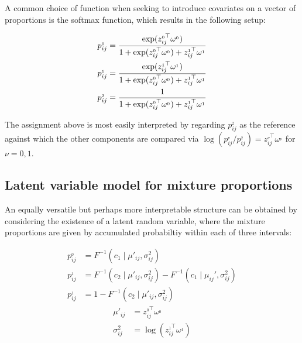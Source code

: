 A common choice of function when seeking to introduce covariates on a vector of proportions is the softmax function, which results in the following setup:

\begin{equation}
\begin{split}
p_{ij}^{_0} &= {\exp (z_{ij}^{_0\top} \omega^{_0}) \over 1 + \exp (z_{ij}^{_0\top} \omega^{_0})  + z_{ij}^{_1\top} \omega^{_1}} \\
p_{ij}^{_1} &= {\exp (z_{ij}^{_1\top} \omega^{_1}) \over 1 + \exp (z_{ij}^{_0\top} \omega^{_0})  + z_{ij}^{_1\top} \omega^{_1}}\\
p_{ij}^{_2} &= {1 \over 1 + \exp (z_{ij}^{_0\top} \omega^{_0})  + z_{ij}^{_1\top} \omega^{_1}}
\end{split}
\label{ec_softmax}
\end{equation}

The assignment above is most easily interpreted by regarding $p_{ij}^{_2}$ as the reference against which the other components are compared via $\log (p_{ij}^{_\nu} / p_{ij}^{_2}) = z_{ij}^{_\nu\top} \omega^{_\nu}$ for $\nu=0,1$.

\subsection{Latent variable model for mixture proportions}
\label{sec:normalp}

An equally versatile but perhaps more interpretable structure can be obtained by considering the existence of a latent random variable, where the mixture proportions are given by accumulated probabiltiy within each of three intervals:

\begin{equation}
\begin{split}
p_{ij}^{_0} &= F^{-1}(c_1 \mid \mu'_{ij}, \sigma_{ij}^2) \\
p_{ij}^{_1} &= F^{-1}(c_2 \mid \mu'_{ij}, \sigma_{ij}^2) - F^{-1}(c_1 \mid \mu_{ij}', \sigma_{ij}^2) \\
p_{ij}^{_1} &= 1 - F^{-1}(c_2 \mid \mu'_{ij}, \sigma_{ij}^2)
\end{split}
\end{equation}
\begin{equation}
\begin{split}
\mu'_{ij} &=  z_{ij}^{_0\top} \omega^{_0}\\
\sigma_{ij}^{2} &= \log(z_{ij}^{_1\top} \omega^{_1})
\end{split}
\end{equation}

